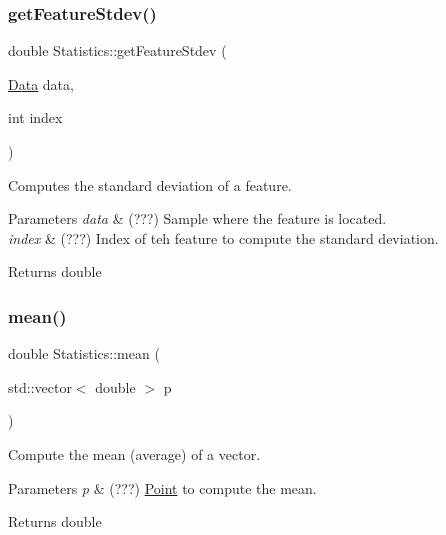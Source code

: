 \subsubsection{\texorpdfstring{get\+Feature\+Stdev()}{getFeatureStdev()}}
{\footnotesize\ttfamily double Statistics\+::get\+Feature\+Stdev (\begin{DoxyParamCaption}\item[{\hyperlink{class_data}{Data}}]{data,  }\item[{int}]{index }\end{DoxyParamCaption})\hspace{0.3cm}{\ttfamily [static]}}



Computes the standard deviation of a feature. 


\begin{DoxyParams}{Parameters}
{\em data} & (???) Sample where the feature is located. \\
\hline
{\em index} & (???) Index of teh feature to compute the standard deviation. \\
\hline
\end{DoxyParams}
\begin{DoxyReturn}{Returns}
double 
\end{DoxyReturn}
\mbox{\label{class_statistics_ab121520f7556f75e295e04ff71f2af39}} 
\subsubsection{\texorpdfstring{mean()}{mean()}}
{\footnotesize\ttfamily double Statistics\+::mean (\begin{DoxyParamCaption}\item[{std\+::vector$<$ double $>$}]{p }\end{DoxyParamCaption})\hspace{0.3cm}{\ttfamily [static]}}



Compute the mean (average) of a vector. 


\begin{DoxyParams}{Parameters}
{\em p} & (???) \hyperlink{class_point}{Point} to compute the mean. \\
\hline
\end{DoxyParams}
\begin{DoxyReturn}{Returns}
double 
\end{DoxyReturn}
\mbox{\label{class_statistics_a75435245095cd0fd54b2d57a6ae592da}} 
